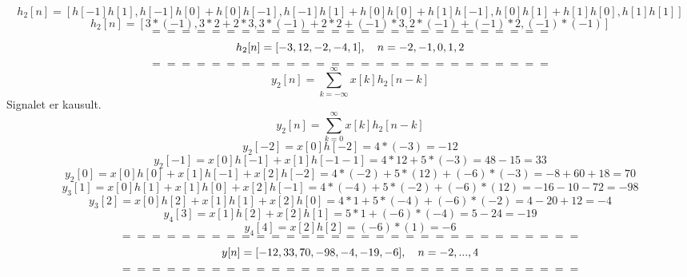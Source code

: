 \begin{EksamensOpgaver}
\begin{Eksamenssæt}[2024 Ordinær]
\begin{eksamensOpgave}
\begin{UnderOpgave}
            \[h_2[n] = [h[-1]h[1], h[-1]h[0] + h[0]h[-1], h[-1]h[1] + h[0]h[0] + h[1]h[-1], h[0]h[1] + h[1]h[0], h[1]h[1]]\]
            \[h_2[n] = [3 * (-1), 3 * 2 + 2 * 3, 3 * (-1) + 2 * 2 + (-1) * 3, 2 * (-1) + (-1) * 2, (-1)*(-1)]\]
            \[===========================\]
            \[h_2[n] = [-3, 12, -2, -4, 1], \tab{0} n = -2, -1, 0, 1, 2\]
            \[===========================\]
            \[y_2[n] = \sum_{k = -\infty}^{\infty}{x[k]h_2[n - k]}\]
            Signalet er kausult. 
            \[y_2[n] = \sum_{k = 0}^{\infty}{x[k]h_2[n - k]}\]
            \[y_2[-2] = x[0]h[-2] = 4 * (-3) = -12\]
            \[y_2[-1] = x[0]h[-1] + x[1]h[-1-1] = 4 * 12 + 5 * (-3) = 48 - 15 = 33\]
            \[y_2[0] = x[0]h[0] + x[1]h[-1] + x[2]h[-2] = 4 * (-2) + 5 * (12) + (-6)*(-3) = -8 + 60 + 18 = 70\]
            \[y_3[1] = x[0]h[1] + x[1]h[0] + x[2]h[-1] = 4 * (-4) + 5 * (-2) + (-6)*(12) = - 16 - 10 - 72 = -98\]
            \[y_3[2] = x[0]h[2] + x[1]h[1] + x[2]h[0] = 4 * 1 + 5 * (-4) + (-6)*(-2) = 4 - 20 + 12 = -4\]
            \[y_4[3] = x[1]h[2] + x[2]h[1] = 5 * 1 + (-6)*(-4) = 5 - 24 = -19\]
            \[y_4[4] = x[2]h[2] = (-6)*(1) = -6\]
            \[===============================\]
            \[y[n] = [-12, 33, 70, -98, -4, -19, -6], \tab{0} n = -2, ..., 4\]
            \[===============================\]


\end{UnderOpgave}
\end{eksamensOpgave}
\end{Eksamenssæt}
\end{EksamensOpgaver}
